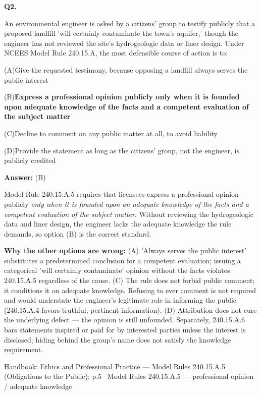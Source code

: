 \documentclass[11pt]{article}
\newcommand{\correct}[1]{\textbf{#1}\;{\color{accent}$\checkmark$}}
\newcommand{\optline}[2]{\par\noindent\hspace{1.2em}(#1)\hspace{0.6em}#2}
\begin{document}
\vspace{9pt}
\filbreak
\textbf{\color{accent}Q2.}\par\vspace{2pt}
An environmental engineer is asked by a citizens' group to testify publicly that a proposed landfill 'will certainly contaminate the town's aquifer,' though the engineer has not reviewed the site's hydrogeologic data or liner design. Under NCEES Model Rule 240.15.A, the most defensible course of action is to:\par\par\vspace{3pt}
\optline{A}{Give the requested testimony, because opposing a landfill always serves the public interest}
\optline{B}{\correct{Express a professional opinion publicly only when it is founded upon adequate knowledge of the facts and a competent evaluation of the subject matter}}
\optline{C}{Decline to comment on any public matter at all, to avoid liability}
\optline{D}{Provide the statement as long as the citizens' group, not the engineer, is publicly credited}
\par\vspace{3pt}
\vspace{2pt}\par\noindent\colorbox{boxbg}{\parbox{\dimexpr\linewidth-2\fboxsep\relax}{%
\vspace{2pt}\textbf{Answer:} (B)\par\vspace{2pt}
{\small Model Rule 240.15.A.5 requires that licensees express a professional opinion publicly \emph{only when it is founded upon an adequate knowledge of the facts and a competent evaluation of the subject matter}. Without reviewing the hydrogeologic data and liner design, the engineer lacks the adequate knowledge the rule demands, so option (B) is the correct standard.\par
\textbf{Why the other options are wrong:} (A) 'Always serves the public interest' substitutes a predetermined conclusion for a competent evaluation; issuing a categorical 'will certainly contaminate' opinion without the facts violates 240.15.A.5 regardless of the cause. (C) The rule does not forbid public comment; it conditions it on adequate knowledge. Refusing to ever comment is not required and would understate the engineer's legitimate role in informing the public (240.15.A.4 favors truthful, pertinent information). (D) Attribution does not cure the underlying defect --- the opinion is still unfounded. Separately, 240.15.A.6 bars statements inspired or paid for by interested parties unless the interest is disclosed; hiding behind the group's name does not satisfy the knowledge requirement.\par}\par\vspace{2pt}
{\footnotesize\color{soft}Handbook: Ethics and Professional Practice --- Model Rules 240.15.A.5 (Obligations to the Public): p.5 \textbullet\ Model Rules 240.15.A.5 --- professional opinion / adequate knowledge}\vspace{2pt}
}}
\end{document}
